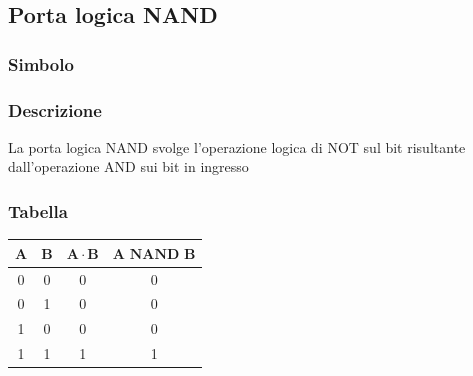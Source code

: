 \subsection{Porta logica NAND}
\begin{minipage}[t]{0.31\textwidth}
    \subsubsection{Simbolo}
\end{minipage}
\hfil
\begin{minipage}[t]{0.31\textwidth}
    \subsubsection{Descrizione}
    La porta logica NAND svolge l'operazione logica di NOT sul bit risultante dall'operazione AND sui bit in ingresso
\end{minipage}
\hfil
\begin{minipage}[t]{0.31\textwidth}
    \subsubsection{Tabella}
    \begin{tabular}{|c|c|c|c|}
        \hline
        $\mathbf{A}$ & $\mathbf{B}$ & $\mathbf{A \cdot B}$ & $\mathbf{A \text{ NAND } B}$ \\ \hline
        0 & 0 & 0 & 0 \\ \hline
        0 & 1 & 0 & 0 \\ \hline
        1 & 0 & 0 & 0 \\ \hline
        1 & 1 & 1 & 1 \\ \hline
    \end{tabular}
\end{minipage}

